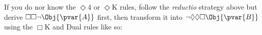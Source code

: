 \documentclass[../../../include/open-logic-section]{subfiles}
\begin{document}
\begin{prob}
\begin{ans}
\begin{enumerate}
        If you do nor know the $\Diamond$4 or $\Diamond$K rules,
        follow the \emph{reductio} strategy above but derive
        $\Box\Box\lnot\Obj{\pvar{A}}$ first, then transform it into
        $\lnot\Diamond\Diamond\Box\Obj{\pvar{B}}$ using the $\Box$K
        and Dual rules like so:
        {\footnotesize
        \begin{prooftree}
        \end{prooftree}
        }
     
    \end{enumerate}

    \clearpage
    \end{ans}

\end{prob}
\end{document}
